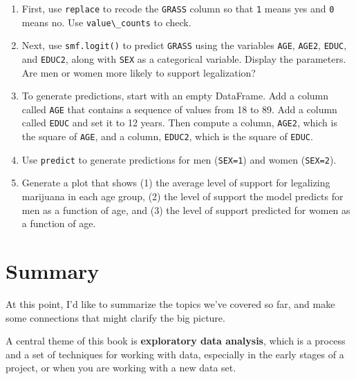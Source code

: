 \begin{enumerate}
\def\labelenumi{\arabic{enumi}.}
\item
  First, use \passthrough{\lstinline!replace!} to recode the
  \passthrough{\lstinline!GRASS!} column so that
  \passthrough{\lstinline!1!} means yes and \passthrough{\lstinline!0!}
  means no. Use \passthrough{\lstinline!value\_counts!} to check.
\item
  Next, use \passthrough{\lstinline!smf.logit()!} to predict
  \passthrough{\lstinline!GRASS!} using the variables
  \passthrough{\lstinline!AGE!}, \passthrough{\lstinline!AGE2!},
  \passthrough{\lstinline!EDUC!}, and \passthrough{\lstinline!EDUC2!},
  along with \passthrough{\lstinline!SEX!} as a categorical variable.
  Display the parameters. Are men or women more likely to support
  legalization?
\item
  To generate predictions, start with an empty DataFrame. Add a column
  called \passthrough{\lstinline!AGE!} that contains a sequence of
  values from 18 to 89. Add a column called
  \passthrough{\lstinline!EDUC!} and set it to 12 years. Then compute a
  column, \passthrough{\lstinline!AGE2!}, which is the square of
  \passthrough{\lstinline!AGE!}, and a column,
  \passthrough{\lstinline!EDUC2!}, which is the square of
  \passthrough{\lstinline!EDUC!}.
\item
  Use \passthrough{\lstinline!predict!} to generate predictions for men
  (\passthrough{\lstinline!SEX=1!}) and women
  (\passthrough{\lstinline!SEX=2!}).
\item
  Generate a plot that shows (1) the average level of support for
  legalizing marijuana in each age group, (2) the level of support the
  model predicts for men as a function of age, and (3) the level of
  support predicted for women as a function of age.
\end{enumerate}

\hypertarget{summary}{%
\section{Summary}\label{summary}}

At this point, I'd like to summarize the topics we've covered so far,
and make some connections that might clarify the big picture.

A central theme of this book is \textbf{exploratory data analysis},
which is a process and a set of techniques for working with data,
especially in the early stages of a project, or when you are working
with a new data set.

